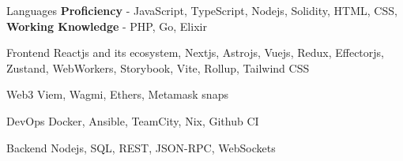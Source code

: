 

\begin{cvskills}

  \cvskill
    {Languages} %
    {\textbf{Proficiency} - JavaScript, TypeScript, Nodejs, Solidity, HTML, CSS, \textbf{Working Knowledge} - PHP, Go, Elixir} %

  \cvskill
    {Frontend} %
    {Reactjs and its ecosystem, Nextjs, Astrojs, Vuejs, Redux, Effectorjs, Zustand, WebWorkers, Storybook, Vite, Rollup, Tailwind CSS} %

  \cvskill
    {Web3} %
    {Viem, Wagmi, Ethers, Metamask snaps} %

  \cvskill
    {DevOps} %
    {Docker, Ansible, TeamCity, Nix, Github CI} %

  \cvskill
    {Backend} %
    {Nodejs, SQL, REST, JSON-RPC, WebSockets} %

\end{cvskills}
